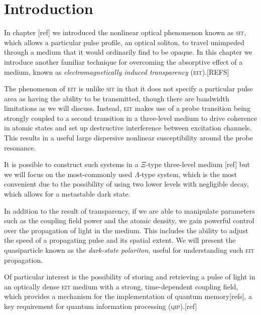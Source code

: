 \section{Introduction}
  \label{sec:polaritons_intro}

  In chapter [ref] we introduced the nonlinear optical phenomenon known as
  \textsc{sit}, which allows a particular pulse profile, an optical soliton, to
  travel unimpeded through a medium that it would ordinarily find to be opaque.
  In this chapter we introduce another familiar technique for overcoming the
  absorptive effect of a medium, known as \textit{electromagnetically induced
  transparency} (\textsc{eit}).[REFS]

  The phenomenon of \textsc{eit} is unlike \textsc{sit} in that it does not
  specify a particular pulse area as having the ability to be transmitted,
  though there are bandwidth limitations as we will discuss. Instead,
  \textsc{eit} makes use of a probe transition being strongly coupled to a
  second transition in a three-level medium to drive coherence in atomic states
  and set up destructive interference between excitation channels. This results
  in a useful large dispersive nonlinear susceptibility around the probe
  resonance.

  It is possible to construct such systems in a $\Xi$-type three-level medium
  [ref] but we will focus on the most-commonly used $\Lambda$-type system, which
  is the most convenient due to the possibility of using two lower levels with
  negligible decay, which allows for a metastable dark state.

  In addition to the result of transparency, if we are able to manipulate
  parameters such as the coupling field power and the atomic density, we gain
  powerful control over the propagation of light in the medium. This includes
  the ability to adjust the speed of a propagating pulse and its spatial extent.
  We will present the quasiparticle known as the \textit{dark-state polariton},
  useful for understanding such \textsc{eit} propagation.

  Of particular interest is the possibility of storing and retrieving a pulse of
  light in an optically dense \textsc{eit} medium with a strong, time-dependent
  coupling field, which provides a mechanism for the implementation of quantum
  memory[refs], a key requirement for quantum information processing
  (\textsc{qip}).[ref]


